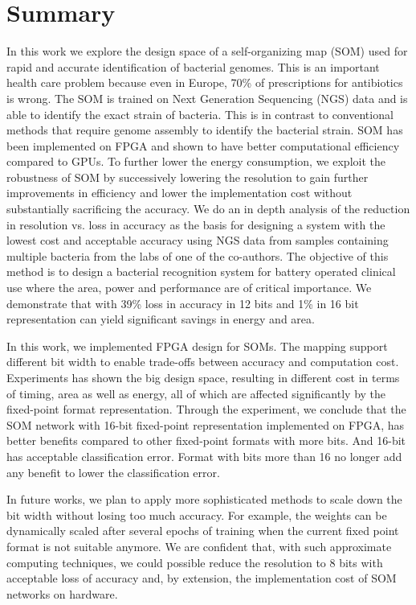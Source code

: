 \section{Summary}
In this work we explore the design space of a self-organizing map (SOM) used for rapid and accurate identification of bacterial genomes. This is an important health care problem because even in Europe, 70\% of prescriptions for antibiotics is wrong.  The  SOM is trained on Next Generation Sequencing (NGS) data and is able to identify the exact strain of bacteria. This is in contrast to conventional methods that require genome assembly to identify the bacterial strain. SOM has been implemented on FPGA and shown to have better computational efficiency compared to GPUs. To further lower the energy consumption, we exploit the robustness of SOM by successively lowering the resolution to gain further improvements in efficiency and lower the implementation cost without substantially sacrificing the accuracy. We do an in depth analysis of the reduction in resolution vs. loss in accuracy as the basis for designing a system with the lowest cost and acceptable accuracy using NGS data from  samples containing multiple bacteria from the labs of one of the co-authors. The objective of this method is to design a bacterial recognition system for battery operated clinical use where the area, power and performance are of critical importance. We demonstrate that with 39\% loss in accuracy in 12 bits and 1\% in 16 bit representation can yield significant savings in energy and area.

In this work, we implemented FPGA design for SOMs. The mapping support different bit width to enable trade-offs between accuracy and computation cost. Experiments has shown the big design space, resulting in different cost in terms of timing, area as well as energy, all of which are affected significantly by the fixed-point format representation. Through the experiment, we conclude that the SOM network with 16-bit fixed-point representation implemented on FPGA, has better benefits compared to other fixed-point formats with more bits. And 16-bit has acceptable classification error. Format with bits more than 16 no longer add any benefit to lower the classification error. 

In future works, we plan to apply more sophisticated methods to scale down the bit width without losing too much accuracy. For example, the weights can be dynamically scaled after several epochs of training when the current fixed point format is not suitable anymore. We are confident that, with such approximate computing techniques, we could possible reduce the resolution to 8 bits with acceptable loss of accuracy and, by extension, the implementation cost of SOM networks on hardware.